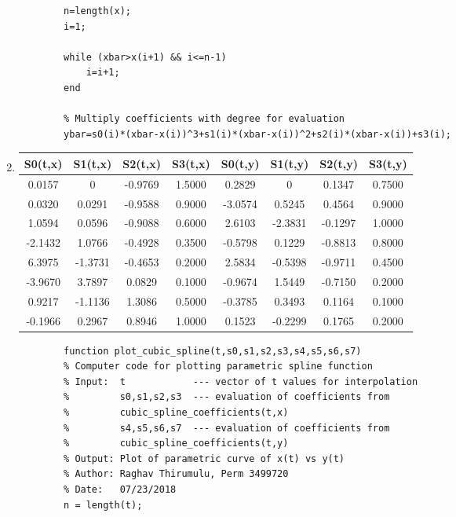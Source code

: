 \documentclass{article}
\begin{document}
\begin{enumerate}
\begin{lstlisting}
        n=length(x);
        i=1;

        while (xbar>x(i+1) && i<=n-1)
            i=i+1;
        end

        % Multiply coefficients with degree for evaluation
        ybar=s0(i)*(xbar-x(i))^3+s1(i)*(xbar-x(i))^2+s2(i)*(xbar-x(i))+s3(i);
        \end{lstlisting}
    
    \item
        \begin{tabular}{||c c c c c c c c||} 
        \hline
         S0(t,x) & S1(t,x) & S2(t,x) & S3(t,x) & S0(t,y) & S1(t,y) & S2(t,y) & S3(t,y)  \\ [0.5ex] 
        \hline \hline
        0.0157 & 0 & -0.9769 & 1.5000 & 0.2829 & 0 & 0.1347 & 0.7500 \\ 
        \hline
        0.0320 & 0.0291 & -0.9588 & 0.9000 & -3.0574 & 0.5245 & 0.4564 & 0.9000 \\
        \hline
        1.0594 & 0.0596 & -0.9088 & 0.6000 & 2.6103 & -2.3831 & -0.1297 & 1.0000 \\
        \hline
        -2.1432 & 1.0766 & -0.4928 & 0.3500 & -0.5798 & 0.1229 & -0.8813 & 0.8000 \\
        \hline
        6.3975 & -1.3731 & -0.4653 & 0.2000 & 2.5834 & -0.5398 & -0.9711 & 0.4500 \\  
        \hline
        -3.9670 & 3.7897 & 0.0829 & 0.1000 & -0.9674 & 1.5449 & -0.7150 & 0.2000 \\
        \hline
        0.9217 & -1.1136 & 1.3086 & 0.5000 & -0.3785 & 0.3493 & 0.1164 & 0.1000 \\
        \hline
        -0.1966 & 0.2967 & 0.8946 & 1.0000 & 0.1523 & -0.2299 & 0.1765 & 0.2000 \\ [0.5ex]
        \hline
\end{tabular}
        \begin{lstlisting}
        function plot_cubic_spline(t,s0,s1,s2,s3,s4,s5,s6,s7)
        % Computer code for plotting parametric spline function
        % Input:  t            --- vector of t values for interpolation
        %         s0,s1,s2,s3  --- evaluation of coefficients from
        %         cubic_spline_coefficients(t,x)
        %         s4,s5,s6,s7  --- evaluation of coefficients from
        %         cubic_spline_coefficients(t,y)
        % Output: Plot of parametric curve of x(t) vs y(t)
        % Author: Raghav Thirumulu, Perm 3499720
        % Date:   07/23/2018
        n = length(t);


\end{lstlisting}
\end{enumerate}
\end{document}
